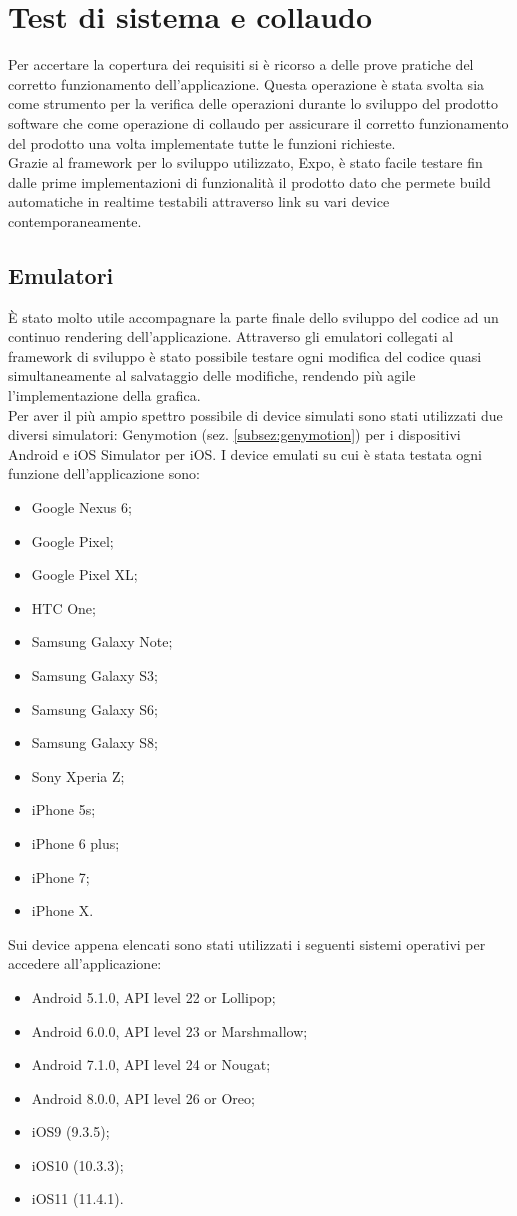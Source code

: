 \section{Test di sistema e collaudo}
Per accertare la copertura dei requisiti si è ricorso a delle prove pratiche del corretto funzionamento dell’applicazione. Questa operazione è stata svolta sia come strumento per la verifica delle operazioni durante lo sviluppo del prodotto software che come operazione di collaudo per assicurare il corretto funzionamento del prodotto una volta implementate tutte le funzioni richieste. \\
Grazie al framework per lo sviluppo utilizzato, Expo, è stato facile testare fin dalle prime implementazioni di funzionalità il prodotto dato che permete build automatiche in realtime testabili attraverso link su vari device contemporaneamente.
\subsection{Emulatori}
È stato molto utile accompagnare la parte finale dello sviluppo del codice ad un continuo rendering dell'applicazione. Attraverso gli emulatori collegati al framework di sviluppo è stato possibile testare ogni modifica del codice quasi simultaneamente al salvataggio delle modifiche, rendendo più agile l'implementazione della grafica. \\
Per aver il più ampio spettro possibile di device simulati sono stati utilizzati due diversi simulatori: Genymotion (sez. \ref{subsez:genymotion}) per i dispositivi Android e iOS Simulator per iOS.
I device emulati su cui è stata testata ogni funzione dell'applicazione sono:
\begin{itemize}
	\item Google Nexus 6;
	\item Google Pixel;
	\item Google Pixel XL;
	\item HTC One;
	\item Samsung Galaxy Note;
	\item Samsung Galaxy S3;
	\item Samsung Galaxy S6;
	\item Samsung Galaxy S8;
	\item Sony Xperia Z;
	\item iPhone 5s;
	\item iPhone 6 plus;
	\item iPhone 7;
	\item iPhone X.
\end{itemize}
Sui device appena elencati sono stati utilizzati i seguenti sistemi operativi per accedere all'applicazione:
\begin{itemize}
	\item Android 5.1.0, API level 22 or Lollipop;
	\item Android 6.0.0, API level 23 or Marshmallow;
	\item Android 7.1.0,  API level 24 or Nougat;
	\item Android 8.0.0,  API level 26 or Oreo;
	\item iOS9 (9.3.5);
	\item iOS10 (10.3.3);
	\item iOS11 (11.4.1).
\end{itemize}
